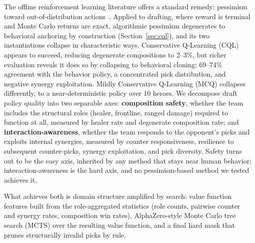 \documentclass[journal]{IEEEtran}
\begin{document}
The offline reinforcement learning literature offers a standard remedy: pessimism toward out-of-distribution actions~\cite{kumar2020conservative,lyu2022mildly}. Applied to drafting, where reward is terminal and Monte Carlo returns are exact, algorithmic pessimism degenerates to behavioral anchoring by construction (Section~\ref{sec:cql}), and its two instantiations collapse in characteristic ways. Conservative Q-Learning (CQL) appears to succeed, reducing degenerate compositions to 2--3\%, but richer evaluation reveals it does so by collapsing to behavioral cloning: 69--74\% agreement with the behavior policy, a concentrated pick distribution, and negative synergy exploitation. Mildly Conservative Q-Learning (MCQ) collapses differently, to a near-deterministic policy over 10 heroes. We decompose draft policy quality into two separable axes: \textbf{composition safety}, whether the team includes the structural roles (healer, frontline, ranged damage) required to function at all, measured by healer rate and degenerate composition rate; and \textbf{interaction-awareness}, whether the team responds to the opponent's picks and exploits internal synergies, measured by counter responsiveness, resilience to subsequent counter-picks, synergy exploitation, and pick diversity. Safety turns out to be the easy axis, inherited by any method that stays near human behavior; interaction-awareness is the hard axis, and no pessimism-based method we tested achieves it.

What achieves both is domain structure amplified by search: value function features built from the role-aggregated statistics (role counts, pairwise counter and synergy rates, composition win rates), AlphaZero-style Monte Carlo tree search (MCTS) over the resulting value function, and a final hard mask that prunes structurally invalid picks by rule.
\end{document}
